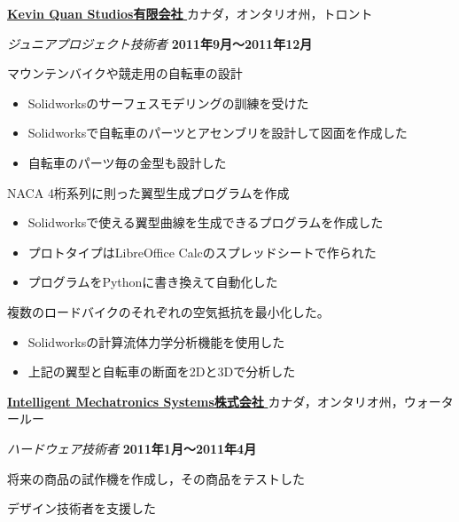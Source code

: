 \documentclass[10pt, a4paper]{article}
\def\xeCJKembold{0.15}
\def\saveCJKnode{\dimen255\lastkern}
\def\restoreCJKnode{\kern-\dimen255\kern\dimen255}
\let\CJKoldsymbol\CJKsymbol
\let\CJKoldpunctsymbol\CJKpunctsymbol
\def\CJKfakeboldsymbol#1{%
\special{pdf:literal direct 2 Tr \xeCJKembold\space w}%
\CJKoldsymbol{#1}%
\saveCJKnode
\special{pdf:literal direct 0 Tr}%
\restoreCJKnode}
\def\CJKfakeboldpunctsymbol#1{%
\special{pdf:literal direct 2 Tr \xeCJKembold\space w}%
\CJKoldpunctsymbol{#1}%
\saveCJKnode
\special{pdf:literal direct 0 Tr}%
\restoreCJKnode}
\newcommand\CJKfakebold[1]{%
\let\CJKsymbol\CJKfakeboldsymbol
\let\CJKpunctsymbol\CJKfakeboldpunctsymbol
#1%
\let\CJKsymbol\CJKoldsymbol
\let\CJKpunctsymbol\CJKoldpunctsymbol}
\begin{document}
\halfblankline

\href{http://www.kqbikes.com/}{\CJKfakebold{\textbf{Kevin Quan Studios有限会社}}}\hfill カナダ，オンタリオ州，トロント

\begin{outerlist}
\item[] \textit{ジュニアプロジェクト技術者} \hfill \textbf{2011年9月〜2011年12月}
  \begin{innerlist}
  \item マウンテンバイクや競走用の自転車の設計
  \begin{itemize}
    \item Solidworksのサーフェスモデリングの訓練を受けた
    \item Solidworksで自転車のパーツとアセンブリを設計して図面を作成した
    \item 自転車のパーツ毎の金型も設計した
  \end{itemize}
  \item NACA 4桁系列に則った翼型生成プログラムを作成
  \begin{itemize}
    \item Solidworksで使える翼型曲線を生成できるプログラムを作成した
    \item プロトタイプはLibreOffice Calcのスプレッドシートで作られた
    \item プログラムをPythonに書き換えて自動化した
  \end{itemize}
  \item 複数のロードバイクのそれぞれの空気抵抗を最小化した。
  \begin{itemize}
    \item Solidworksの計算流体力学分析機能を使用した
    \item 上記の翼型と自転車の断面を2Dと3Dで分析した
  \end{itemize}
  \end{innerlist}
\end{outerlist}

\halfblankline

\href{http://www.intellimec.com/}{\CJKfakebold{\textbf{Intelligent Mechatronics Systems株式会社}}}\hfill カナダ，オンタリオ州，ウォータールー

\begin{outerlist}
\item[] \textit{ハードウェア技術者} \hfill \textbf{2011年1月〜2011年4月}
  \begin{innerlist}
  \item 将来の商品の試作機を作成し，その商品をテストした
  \item デザイン技術者を支援した
  \end{innerlist}
\end{outerlist}
\end{document}

